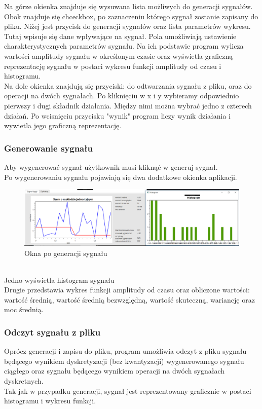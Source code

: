 \documentclass[12pt]{article}
\begin{document}
Na górze okienka znajduje się wysuwana lista możliwych do generacji sygnałów. Obok znajduje się chceckbox, po zaznaczeniu którego sygnał zostanie zapisany do pliku.
Niżej jest przycisk do generacji sygnałów oraz lista parametrów wykresu. Tutaj wpisuje się dane wpływające na sygnał.
Pola umożliwiają ustawienie charakterystycznych parametrów sygnału. Na ich podstawie program wylicza wartości amplitudy sygnału w określonym czasie oraz wyświetla graficzną reprezentację sygnału w postaci wykresu funkcji amplitudy od czasu i histogramu.\\

Na dole okienka znajdują się przyciski: do odtwarzania sygnału z pliku, oraz do operacji na dwóch sygnałach. Po kliknięciu w x i y wybieramy odpowiednio pierwszy i dugi składnik działania. Między nimi można wybrać jedno z czterech działań.  Po wcisnięciu przycisku "wynik" program liczy wynik działania i wywietla jego graficzną reprezentację. 

\subsubsection{Generowanie sygnału}
Aby wygenerować sygnał użytkownik musi kliknąć w generuj sygnał.
\\Po wygenerowaniu sygnału pojawiają się dwa dodatkowe okienka aplikacji.
\begin{figure}[h!]
 \centering
 \includegraphics[width=15.3cm]{okienka.PNG}
 \vspace{-0.3cm}
 \caption{Okna po generacji sygnału}
 \label{Widok_aplikacjis}
\end{figure}
\\Jedno wyświetla histogram sygnału
\\Drugie przedstawia wykres funkcji amplitudy od czasu oraz obliczone wartości: wartość średnią, wartość średnią bezwzględną, wartość skuteczną, wariancję oraz moc średnią.

\subsubsection{Odczyt sygnału z pliku}
Oprócz generacji i zapisu do pliku, program umożliwia odczyt z pliku sygnału będącego wynikiem dyskretyzacji (bez kwantyzacji) wygenerowanego
sygnału ciągłego oraz sygnału będącego wynikiem operacji na dwóch sygnałach dyskretnych.
\\Tak jak w przypadku generacji, sygnał jest  reprezentowany graficznie w postaci histogramu i wykresu funkcji.
\end{document}
